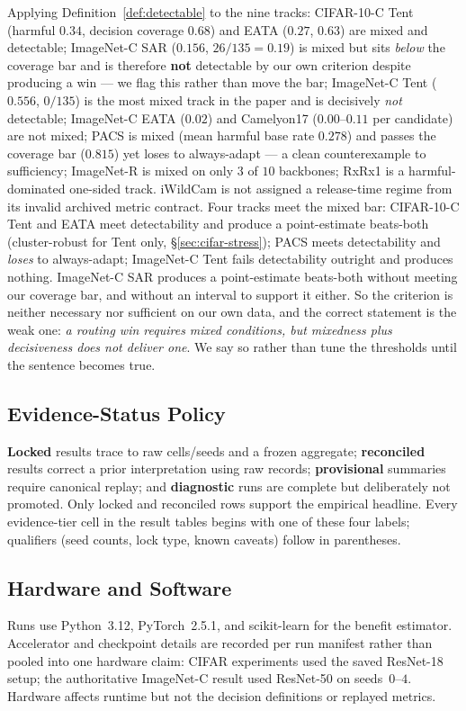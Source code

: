 Applying Definition~\ref{def:detectable} to the nine tracks: CIFAR-10-C Tent (harmful $0.34$,
decision coverage $0.68$) and EATA ($0.27$, $0.63$) are mixed and detectable; ImageNet-C SAR
($0.156$, $26/135=0.19$) is mixed but sits \emph{below} the coverage bar and is therefore
\textbf{not} detectable by our own criterion despite producing a win --- we flag this rather than
move the bar; ImageNet-C Tent ($0.556$, $0/135$) is the most mixed track in the paper and is
decisively \emph{not} detectable; ImageNet-C EATA ($0.02$) and Camelyon17 ($0.00$--$0.11$ per
candidate) are not mixed; PACS is mixed (mean harmful base rate $0.278$) and passes the coverage bar
($0.815$) yet loses to always-adapt --- a clean counterexample to sufficiency; ImageNet-R is mixed on
only $3$ of $10$ backbones; RxRx1 is a harmful-dominated one-sided track. iWildCam is not assigned
a release-time regime from its invalid archived metric contract. Four tracks
meet the mixed bar: CIFAR-10-C Tent and EATA meet detectability and produce a point-estimate
beats-both (cluster-robust for Tent only, \S\ref{sec:cifar-stress}); PACS meets
detectability and \emph{loses} to always-adapt; ImageNet-C Tent fails detectability outright and
produces nothing. ImageNet-C SAR produces a point-estimate beats-both without meeting our coverage
bar, and without an interval to support it either. So the
criterion is neither necessary nor sufficient on our own data, and the correct statement is the weak
one: \emph{a routing win requires mixed conditions, but mixedness plus decisiveness does not deliver
one}. We say so rather than tune the thresholds until the sentence becomes true.

\subsection{Evidence-Status Policy}\label{sec:evidence-policy}
\textbf{Locked} results trace to raw cells/seeds and a frozen aggregate; \textbf{reconciled} results correct a prior interpretation using raw records; \textbf{provisional} summaries require canonical replay; and \textbf{diagnostic} runs are complete but deliberately not promoted. Only locked and reconciled rows support the empirical headline. Every evidence-tier cell in the result tables begins with one of these four labels; qualifiers (seed counts, lock type, known caveats) follow in parentheses.

\subsection{Hardware and Software}
Runs use Python~3.12, PyTorch~2.5.1, and scikit-learn for the benefit estimator. Accelerator and
checkpoint details are recorded per run manifest rather than pooled into one hardware claim:
CIFAR experiments used the saved ResNet-18 setup; the authoritative ImageNet-C result used
ResNet-50 on seeds~$0$--$4$. Hardware affects runtime but not the decision definitions or replayed metrics.

